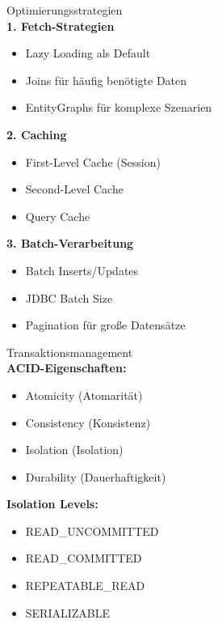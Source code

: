 \begin{KR}{Optimierungsstrategien}\\
\textbf{1. Fetch-Strategien}
\begin{itemize}
    \item Lazy Loading als Default
    \item Joins für häufig benötigte Daten
    \item EntityGraphs für komplexe Szenarien
\end{itemize}

\textbf{2. Caching}
\begin{itemize}
    \item First-Level Cache (Session)
    \item Second-Level Cache
    \item Query Cache
\end{itemize}

\textbf{3. Batch-Verarbeitung}
\begin{itemize}
    \item Batch Inserts/Updates
    \item JDBC Batch Size
    \item Pagination für große Datensätze
\end{itemize}
\end{KR}


\begin{concept}{Transaktionsmanagement}\\
\textbf{ACID-Eigenschaften:}
\begin{itemize}
    \item Atomicity (Atomarität)
    \item Consistency (Konsistenz)
    \item Isolation (Isolation)
    \item Durability (Dauerhaftigkeit)
\end{itemize}

\textbf{Isolation Levels:}
\begin{itemize}
    \item READ\_UNCOMMITTED
    \item READ\_COMMITTED
    \item REPEATABLE\_READ
    \item SERIALIZABLE
\end{itemize}
\end{concept}

